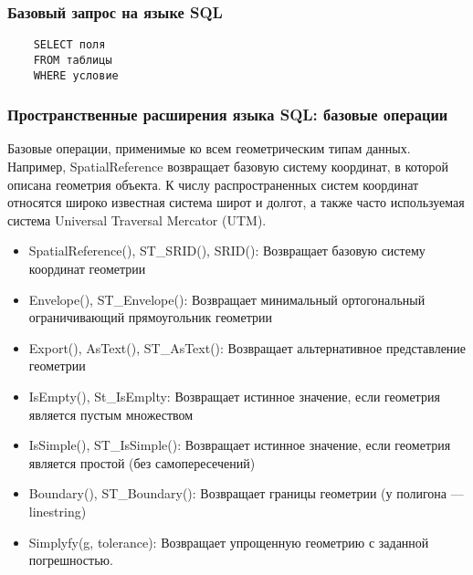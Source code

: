 
\begin{frame}[fragile]
    \frametitle{Базовый запрос на языке SQL}
    \begin{verbatim}
    SELECT поля
    FROM таблицы
    WHERE условие
    \end{verbatim}
\end{frame}

\begin{frame}[allowframebreaks]
    \frametitle{Пространственные расширения языка SQL: базовые операции}
    Базовые операции, применимые ко всем геометрическим типам данных. Например, SpatialReference возвращает базовую систему координат, в которой описана геометрия объекта. К числу распространенных систем координат относятся широко известная система широт и долгот, а также часто используемая система Universal Traversal Mercator (UTM).
    \begin{itemize}
        \item SpatialReference(), ST\_SRID(), SRID(): Возвращает базовую систему координат геометрии
        \item Envelope(), ST\_Envelope(): Возвращает минимальный ортогональный ограничивающий прямоугольник геометрии
        \item Export(), AsText(), ST\_AsText(): Возвращает альтернативное представление геометрии
        \item IsEmpty(), St\_IsEmplty: Возвращает истинное значение, если геометрия является пустым множеством
        \item IsSimple(), ST\_IsSimple(): Возвращает истинное значение, если геометрия является простой (без самопересечений)
        \item Boundary(), ST\_Boundary(): Возвращает границы геометрии (у полигона --- linestring)
        \item Simplyfy(g, tolerance): Возвращает упрощенную геометрию с заданной погрешностью.
    \end{itemize}
\end{frame}


